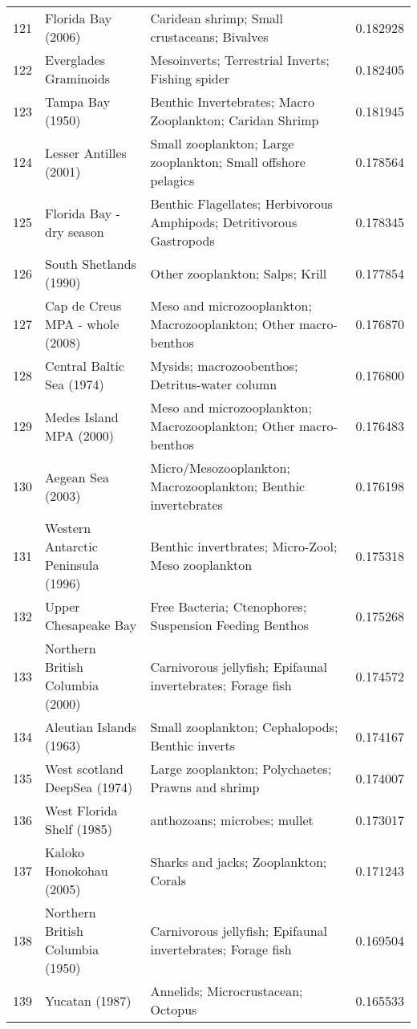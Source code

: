 \begin{tabular}{rllr}
121 & Florida Bay (2006) & Caridean shrimp; Small crustaceans; Bivalves & 0.182928 \\
122 & Everglades Graminoids & Mesoinverts; Terrestrial Inverts; Fishing spider & 0.182405 \\
123 & Tampa Bay (1950) & Benthic Invertebrates; Macro Zooplankton; Caridan Shrimp & 0.181945 \\
124 & Lesser Antilles (2001) & Small zooplankton; Large zooplankton; Small offshore pelagics & 0.178564 \\
125 & Florida Bay - dry season & Benthic Flagellates; Herbivorous Amphipods; Detritivorous Gastropods & 0.178345 \\
126 & South Shetlands (1990) & Other zooplankton; Salps; Krill & 0.177854 \\
127 & Cap de Creus MPA - whole (2008) & Meso and microzooplankton; Macrozooplankton; Other macro-benthos & 0.176870 \\
128 & Central Baltic Sea (1974) & Mysids; macrozoobenthos; Detritus-water column & 0.176800 \\
129 & Medes Island MPA (2000) & Meso and microzooplankton; Macrozooplankton; Other macro-benthos & 0.176483 \\
130 & Aegean Sea (2003) & Micro/Mesozooplankton; Macrozooplankton; Benthic invertebrates & 0.176198 \\
131 & Western Antarctic Peninsula (1996) & Benthic invertbrates; Micro-Zool; Meso zooplankton & 0.175318 \\
132 & Upper Chesapeake Bay & Free Bacteria; Ctenophores; Suspension Feeding Benthos & 0.175268 \\
133 & Northern British Columbia (2000) & Carnivorous jellyfish; Epifaunal invertebrates; Forage fish & 0.174572 \\
134 & Aleutian Islands (1963) & Small zooplankton; Cephalopods; Benthic inverts & 0.174167 \\
135 & West scotland DeepSea (1974) & Large zooplankton; Polychaetes; Prawns and shrimp & 0.174007 \\
136 & West Florida Shelf (1985) & anthozoans; microbes; mullet & 0.173017 \\
137 & Kaloko Honokohau (2005) & Sharks and jacks; Zooplankton; Corals & 0.171243 \\
138 & Northern British Columbia (1950) & Carnivorous jellyfish; Epifaunal invertebrates; Forage fish & 0.169504 \\
139 & Yucatan (1987) & Annelids; Microcrustacean; Octopus & 0.165533 \\

\end{tabular}
